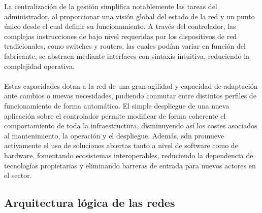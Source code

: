 La centralización de la gestión simplifica notablemente las tareas del administrador, al proporcionar una visión global del estado de la red y un punto único desde el cual definir su funcionamiento. A través del controlador, las complejas instrucciones de bajo nivel requeridas por los dispositivos de red tradicionales, como switches y routers, las cuales podían variar en función del fabricante, se abstraen mediante interfaces con sintaxis intuitiva, reduciendo la complejidad operativa.\\
\\
Estas capacidades dotan a la red de una gran agilidad y capacidad de adaptación ante cambios o nuevas necesidades, pudiendo conmutar entre distintos perfiles de funcionamiento de forma automática. El simple despliegue de una nueva aplicación sobre el controlador permite modificar de forma coherente el comportamiento de toda la infraestructura, disminuyendo así los costes asociados al mantenimiento, la operación y el despliegue. Además, \gls{sdn} promueve activamente el uso de soluciones abiertas tanto a nivel de software como de hardware, fomentando ecosistemas interoperables, reduciendo la dependencia de tecnologías propietarias y eliminando barreras de entrada para nuevos actores en el sector.

\subsection{Arquitectura lógica de las redes }
\label{subsec:arquitectura_sdn}

